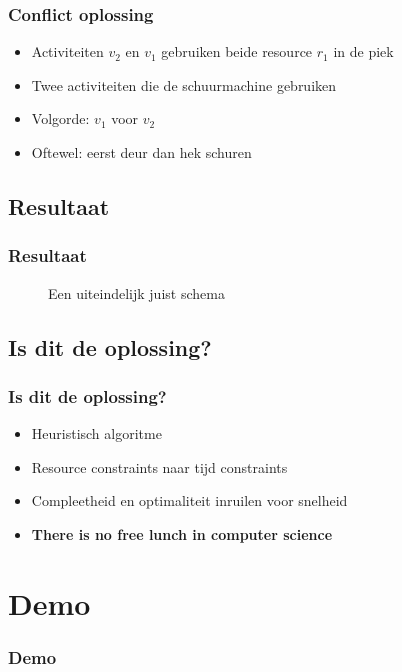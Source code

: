 \documentclass{beamer}
\theoremstyle{definition}
\newcommand{\inputtikz}[1]{}
\begin{document}
\begin{frame}
	\frametitle{Conflict oplossing}
	\begin{itemize}
		\item Activiteiten $v_2$ en $v_1$ gebruiken beide resource $r_1$ in de piek
		\item Twee activiteiten die de schuurmachine gebruiken
		\item<2-> Volgorde: $v_1$ voor $v_2$
		\item<2-> Oftewel: eerst deur dan hek schuren
	\end{itemize}
\end{frame}

\subsection{Resultaat}
\begin{frame}
	\frametitle{Resultaat}
	\vspace{-0.2em}
	\begin{figure}[ht]
		\makebox[\textwidth][c]{\resizebox{.38\paperwidth}{!}{
			\inputtikz{schedule_feasible_profile}
		}}
		\vspace{-1.3em}
		\caption{Een uiteindelijk juist schema}
	\end{figure}
\end{frame}

\subsection{Is dit de oplossing?}
\begin{frame}
	\frametitle{Is dit de oplossing?}
	\begin{itemize}
		\item Heuristisch algoritme
		\item Resource constraints naar tijd constraints
		\item Compleetheid en optimaliteit inruilen voor snelheid
		\item<2-> \textbf{There is no free lunch in computer science}
	\end{itemize}
\end{frame}
	

\section{Demo}
\begin{frame}
	\frametitle{Demo}
\end{frame}
\end{document}
